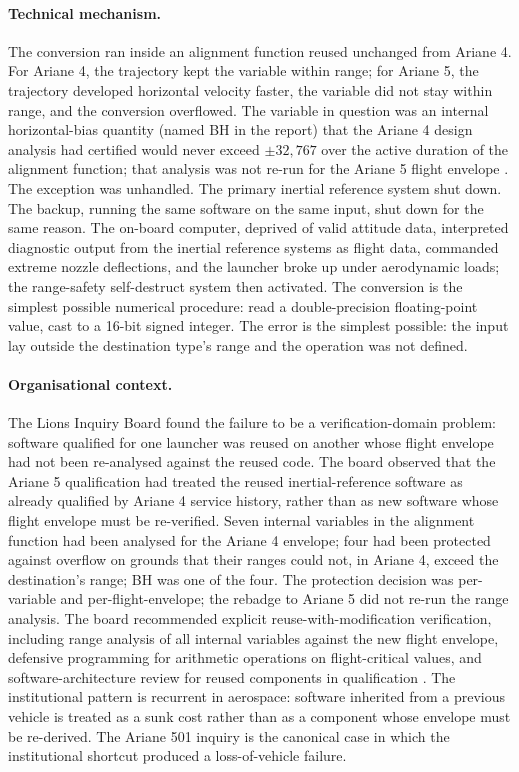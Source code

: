 \paragraph{Technical mechanism.}
The conversion ran inside an alignment function reused unchanged
from Ariane 4. For Ariane 4, the trajectory kept the variable
within range; for Ariane 5, the trajectory developed horizontal
velocity faster, the variable did not stay within range, and the
conversion overflowed. The variable in question was an internal
horizontal-bias quantity (named BH in the report) that the Ariane
4 design analysis had certified would never exceed
$\pm 32{,}767$ over the active duration of the alignment function;
that analysis was not re-run for the Ariane 5 flight envelope
\cite{acc:ariane501-ifr}. The exception was unhandled. The primary
inertial reference system shut down. The backup, running the same
software on the same input, shut down for the same reason. The
on-board computer, deprived of valid attitude data, interpreted
diagnostic output from the inertial reference systems as flight
data, commanded extreme nozzle deflections, and the launcher broke
up under aerodynamic loads; the range-safety self-destruct system
then activated. The conversion is the simplest possible numerical
procedure: read a double-precision floating-point value, cast to
a 16-bit signed integer. The error is the simplest possible:
the input lay outside the destination type's range and the
operation was not defined.

\paragraph{Organisational context.}
The Lions Inquiry Board found the failure to be a verification-domain
problem: software qualified for one launcher was reused on another
whose flight envelope had not been re-analysed against the reused
code. The board observed that the Ariane 5 qualification had treated
the reused inertial-reference software as already qualified by
Ariane 4 service history, rather than as new software whose flight
envelope must be re-verified. Seven internal variables in the
alignment function had been analysed for the Ariane 4 envelope;
four had been protected against overflow on grounds that their
ranges could not, in Ariane 4, exceed the destination's range; BH
was one of the four. The protection decision was per-variable and
per-flight-envelope; the rebadge to Ariane 5 did not re-run the
range analysis. The board recommended explicit reuse-with-modification
verification, including range analysis of all internal variables
against the new flight envelope, defensive programming for arithmetic
operations on flight-critical values, and software-architecture
review for reused components in qualification \cite{acc:ariane501-ifr}.
The institutional pattern is recurrent in aerospace: software
inherited from a previous vehicle is treated as a sunk cost rather
than as a component whose envelope must be re-derived. The Ariane
501 inquiry is the canonical case in which the institutional
shortcut produced a loss-of-vehicle failure.

